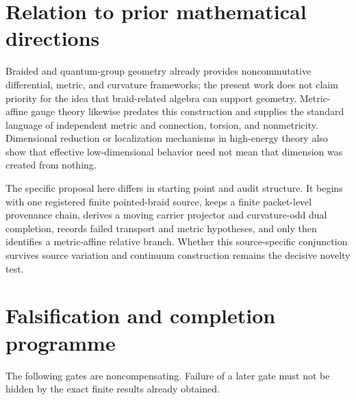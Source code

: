 \documentclass[12pt,a4paper,twoside]{article}
\begin{document}
\section{Relation to prior mathematical directions}

Braided and quantum-group geometry already provides noncommutative differential, metric, and curvature frameworks; the present work does not claim priority for the idea that braid-related algebra can support geometry. Metric-affine gauge theory likewise predates this construction and supplies the standard language of independent metric and connection, torsion, and nonmetricity. Dimensional reduction or localization mechanisms in high-energy theory also show that effective low-dimensional behavior need not mean that dimension was created from nothing.

The specific proposal here differs in starting point and audit structure. It begins with one registered finite pointed-braid source, keeps a finite packet-level provenance chain, derives a moving carrier projector and curvature-odd dual completion, records failed transport and metric hypotheses, and only then identifies a metric-affine relative branch. Whether this source-specific conjunction survives source variation and continuum construction remains the decisive novelty test.

\section{Falsification and completion programme}

The following gates are noncompensating. Failure of a later gate must not be hidden by the exact finite results already obtained.
\end{document}
